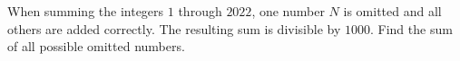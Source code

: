 When summing the integers $1$ through $2022$, one number $N$ is omitted and all others are added correctly. The resulting sum is divisible by $1000$. Find the sum of all possible omitted numbers.
